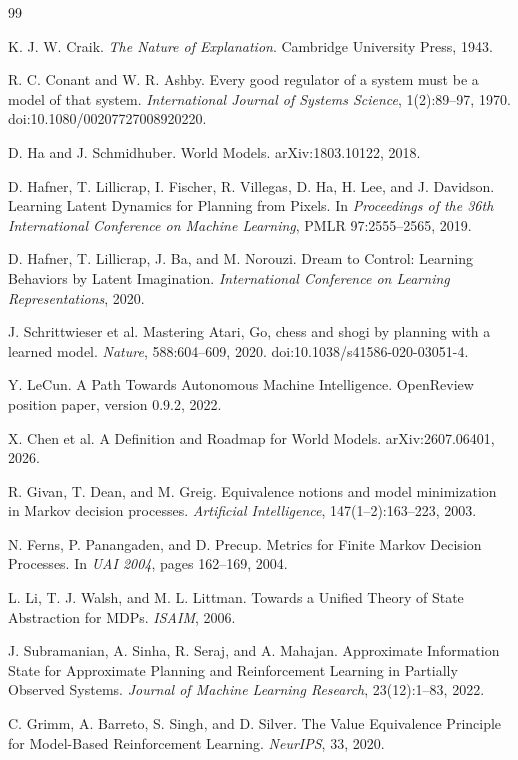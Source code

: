 \documentclass[10pt]{article}
\begin{document}
\begin{thebibliography}{99}

K. J. W. Craik.
\emph{The Nature of Explanation}.
Cambridge University Press, 1943.

R. C. Conant and W. R. Ashby.
Every good regulator of a system must be a model of that system.
\emph{International Journal of Systems Science}, 1(2):89--97, 1970.
doi:10.1080/00207727008920220.

D. Ha and J. Schmidhuber.
World Models.
arXiv:1803.10122, 2018.

D. Hafner, T. Lillicrap, I. Fischer, R. Villegas, D. Ha, H. Lee, and J. Davidson.
Learning Latent Dynamics for Planning from Pixels.
In \emph{Proceedings of the 36th International Conference on Machine Learning}, PMLR 97:2555--2565, 2019.

D. Hafner, T. Lillicrap, J. Ba, and M. Norouzi.
Dream to Control: Learning Behaviors by Latent Imagination.
\emph{International Conference on Learning Representations}, 2020.

J. Schrittwieser et al.
Mastering Atari, Go, chess and shogi by planning with a learned model.
\emph{Nature}, 588:604--609, 2020.
doi:10.1038/s41586-020-03051-4.

Y. LeCun.
A Path Towards Autonomous Machine Intelligence.
OpenReview position paper, version 0.9.2, 2022.

X. Chen et al.
A Definition and Roadmap for World Models.
arXiv:2607.06401, 2026.

R. Givan, T. Dean, and M. Greig.
Equivalence notions and model minimization in Markov decision processes.
\emph{Artificial Intelligence}, 147(1--2):163--223, 2003.

N. Ferns, P. Panangaden, and D. Precup.
Metrics for Finite Markov Decision Processes.
In \emph{UAI 2004}, pages 162--169, 2004.

L. Li, T. J. Walsh, and M. L. Littman.
Towards a Unified Theory of State Abstraction for MDPs.
\emph{ISAIM}, 2006.

J. Subramanian, A. Sinha, R. Seraj, and A. Mahajan.
Approximate Information State for Approximate Planning and Reinforcement Learning in Partially Observed Systems.
\emph{Journal of Machine Learning Research}, 23(12):1--83, 2022.

C. Grimm, A. Barreto, S. Singh, and D. Silver.
The Value Equivalence Principle for Model-Based Reinforcement Learning.
\emph{NeurIPS}, 33, 2020.


\end{thebibliography}
\end{document}
